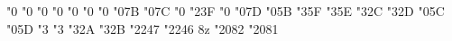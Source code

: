 {  \mathchardef\Xi       "0\hex{}
  \mathchardef\Pi       "0\hex{}
  \mathchardef\Sigma    "0\hex{}
  \mathchardef\Upsilon  "0\hex{}
  \mathchardef\Phi      "0\hex{}
  \mathchardef\Psi      "0\hex{}
  \mathchardef\Omega    "0\hex{}
  \mathchardef\imath    "0\hex\mtifam 7B
  \mathchardef\jmath    "0\hex\mtifam 7C
  \mathchardef\partial           "0\hex{}
  \mathchardef\star              "2\hex\mtifam 3F
  \mathchardef\ell               "0\hex{}
  \mathchardef\wp                "0\hex\mtifam 7D
  \mathchardef\flat              "0\hex\mtifam 5B
  \mathchardef\frown             "3\hex\mtifam 5F
  \mathchardef\smile             "3\hex\mtifam 5E
  \mathchardef\lhook             "3\hex\mtifam 2C
  \mathchardef\rhook             "3\hex\mtifam 2D
  \mathchardef\natural           "0\hex\mtifam 5C
  \mathchardef\sharp             "0\hex\mtifam 5D
  \mathchardef\leftharpoonup     "3\hex{}
  \mathchardef\leftharpoondown   "3\hex{}
  \mathchardef\rightharpoonup    "3\hex\mtifam 2A
  \mathchardef\rightharpoondown  "3\hex\mtifam 2B
  \mathchardef\triangleleft      "2247 
  \mathchardef\triangleright     "2246
  \def\tmpa{8z}\ifx\fotenc\tmpa
    \mathchardef\ddagger     "2082
    \mathchardef\dagger      "2081
  \fi
  \def\lgroup{\delimiter"4\hex\bffam 2833A }%
  \def\rgroup{\delimiter"5\hex\bffam 2933B }%
  \def\bracevert{\delimiter"\hex\ttfam 7C33E }%
  \def\mathcharsback{\mathencread ofs-cm;}%
}









